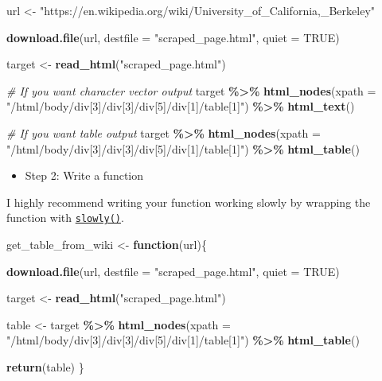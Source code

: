 \documentclass[
]{book}
\newenvironment{Shaded}{\begin{snugshade}}{\end{snugshade}}
\newcommand{\AttributeTok}[1]{\textcolor[rgb]{0.13,0.29,0.53}{#1}}
\newcommand{\CommentTok}[1]{\textcolor[rgb]{0.56,0.35,0.01}{\textit{#1}}}
\newcommand{\ConstantTok}[1]{\textcolor[rgb]{0.56,0.35,0.01}{#1}}
\newcommand{\ControlFlowTok}[1]{\textcolor[rgb]{0.13,0.29,0.53}{\textbf{#1}}}
\newcommand{\FunctionTok}[1]{\textcolor[rgb]{0.13,0.29,0.53}{\textbf{#1}}}
\newcommand{\NormalTok}[1]{#1}
\newcommand{\OtherTok}[1]{\textcolor[rgb]{0.56,0.35,0.01}{#1}}
\newcommand{\SpecialCharTok}[1]{\textcolor[rgb]{0.81,0.36,0.00}{\textbf{#1}}}
\newcommand{\StringTok}[1]{\textcolor[rgb]{0.31,0.60,0.02}{#1}}
\providecommand{\tightlist}{%
  \setlength{\itemsep}{0pt}\setlength{\parskip}{0pt}}
\begin{document}
\begin{Shaded}
\begin{Highlighting}[]
\NormalTok{url }\OtherTok{\textless{}{-}} \StringTok{"https://en.wikipedia.org/wiki/University\_of\_California,\_Berkeley"}

\FunctionTok{download.file}\NormalTok{(url, }\AttributeTok{destfile =} \StringTok{"scraped\_page.html"}\NormalTok{, }\AttributeTok{quiet =} \ConstantTok{TRUE}\NormalTok{)}

\NormalTok{target }\OtherTok{\textless{}{-}} \FunctionTok{read\_html}\NormalTok{(}\StringTok{"scraped\_page.html"}\NormalTok{)}

\CommentTok{\# If you want character vector output}
\NormalTok{target }\SpecialCharTok{\%\textgreater{}\%}
  \FunctionTok{html\_nodes}\NormalTok{(}\AttributeTok{xpath =} \StringTok{"/html/body/div[3]/div[3]/div[5]/div[1]/table[1]"}\NormalTok{) }\SpecialCharTok{\%\textgreater{}\%}
  \FunctionTok{html\_text}\NormalTok{() }

\CommentTok{\# If you want table output }
\NormalTok{target }\SpecialCharTok{\%\textgreater{}\%}
  \FunctionTok{html\_nodes}\NormalTok{(}\AttributeTok{xpath =} \StringTok{"/html/body/div[3]/div[3]/div[5]/div[1]/table[1]"}\NormalTok{) }\SpecialCharTok{\%\textgreater{}\%}
  \FunctionTok{html\_table}\NormalTok{()}
\end{Highlighting}
\end{Shaded}

\begin{itemize}
\tightlist
\item
  Step 2: Write a function
\end{itemize}

I highly recommend writing your function working slowly by wrapping the function with \href{https://purrr.tidyverse.org/reference/insistently.html}{\texttt{slowly()}}.

\begin{Shaded}
\begin{Highlighting}[]
\NormalTok{get\_table\_from\_wiki }\OtherTok{\textless{}{-}} \ControlFlowTok{function}\NormalTok{(url)\{}
  
  \FunctionTok{download.file}\NormalTok{(url, }\AttributeTok{destfile =} \StringTok{"scraped\_page.html"}\NormalTok{, }\AttributeTok{quiet =} \ConstantTok{TRUE}\NormalTok{)}

\NormalTok{  target }\OtherTok{\textless{}{-}} \FunctionTok{read\_html}\NormalTok{(}\StringTok{"scraped\_page.html"}\NormalTok{)}
  
\NormalTok{  table }\OtherTok{\textless{}{-}}\NormalTok{ target }\SpecialCharTok{\%\textgreater{}\%}
    \FunctionTok{html\_nodes}\NormalTok{(}\AttributeTok{xpath =} \StringTok{"/html/body/div[3]/div[3]/div[5]/div[1]/table[1]"}\NormalTok{) }\SpecialCharTok{\%\textgreater{}\%}
    \FunctionTok{html\_table}\NormalTok{() }
  
  \FunctionTok{return}\NormalTok{(table)}
\NormalTok{\}}
\end{Highlighting}
\end{Shaded}
\end{document}
